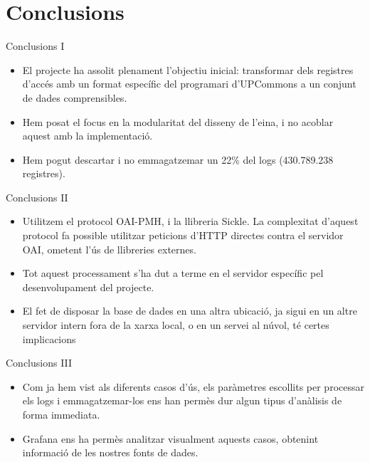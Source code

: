 \section{Conclusions}\label{sec:conclusions}

\begin{frame}{Conclusions I}

\begin{itemize}
    \item El projecte ha assolit plenament l’objectiu inicial: transformar dels registres d’accés amb un format específic del programari d’UPCommons a un conjunt de dades comprensibles.
    \item Hem posat el focus en la modularitat del disseny de l'eina, i no acoblar aquest amb la implementació.
    \item Hem pogut descartar i no emmagatzemar un 22\% del logs (430.789.238 registres).
\end{itemize}

\end{frame}

\begin{frame}{Conclusions II}

    \begin{itemize}
        \item Utilitzem el protocol OAI-PMH, i la llibreria Sickle.
        La complexitat d’aquest protocol fa possible utilitzar peticions d’HTTP directes contra el servidor OAI, ometent l’ús de llibreries externes.
        \item Tot aquest processament s’ha dut a terme en el servidor específic pel desenvolupament del projecte.
        \item El fet de disposar la base de dades en una altra ubicació, ja sigui en un altre servidor intern fora de la xarxa local, o en un servei al núvol, té certes implicacions
    \end{itemize}

\end{frame}

\begin{frame}{Conclusions III}

    \begin{itemize}
        \item Com ja hem vist als diferents casos d’ús, els paràmetres escollits per processar els logs i emmagatzemar-los ens han permès dur algun tipus d’anàlisis de forma immediata.
        \item Grafana ens ha permès analitzar visualment aquests casos, obtenint informació de les nostres fonts de dades.
    \end{itemize}

\end{frame}

